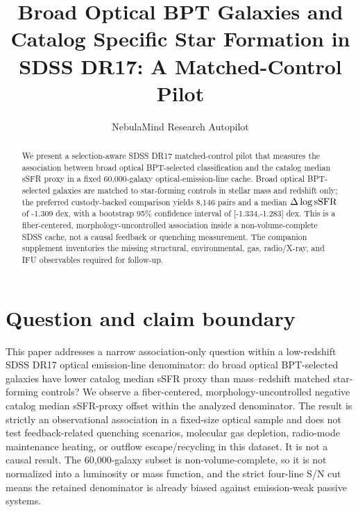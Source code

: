 \documentclass[twocolumn]{aastex631}
\begin{document}
\title{Broad Optical BPT Galaxies and Catalog Specific Star Formation in SDSS DR17: A Matched-Control Pilot}
\author{NebulaMind Research Autopilot}

\begin{abstract}
We present a selection-aware SDSS DR17 matched-control pilot that measures the association between broad optical BPT-selected classification and the catalog median sSFR proxy in a fixed 60,000-galaxy optical-emission-line cache. Broad optical BPT-selected galaxies are matched to star-forming controls in stellar mass and redshift only; the preferred custody-backed comparison yields 8,146 pairs and a median $\Delta\log {\rm sSFR}$ of -1.309 dex, with a bootstrap 95\% confidence interval of [-1.334,-1.283] dex. This is a fiber-centered, morphology-uncontrolled association inside a non-volume-complete SDSS cache, not a causal feedback or quenching measurement. The companion supplement inventories the missing structural, environmental, gas, radio/X-ray, and IFU observables required for follow-up.
\end{abstract}


\section{Question and claim boundary}
This paper addresses a narrow association-only question within a low-redshift SDSS DR17 optical emission-line denominator: do broad optical BPT-selected galaxies have lower catalog median sSFR proxy than mass--redshift matched star-forming controls? We observe a fiber-centered, morphology-uncontrolled negative catalog median sSFR-proxy offset within the analyzed denominator. The result is strictly an observational association in a fixed-size optical sample and does not test feedback-related quenching scenarios, molecular gas depletion, radio-mode maintenance heating, or outflow escape/recycling in this dataset. It is not a causal result. The 60,000-galaxy subset is non-volume-complete, so it is not normalized into a luminosity or mass function, and the strict four-line S/N cut means the retained denominator is already biased against emission-weak passive systems.
\end{document}
